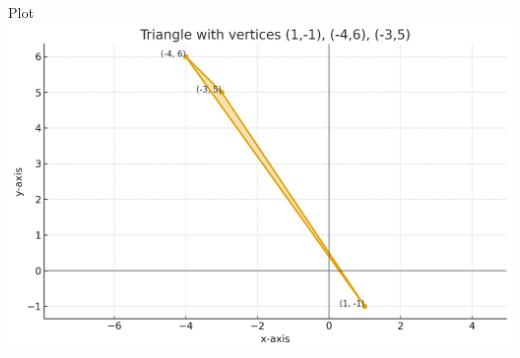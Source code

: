 \documentclass{beamer}
\begin{document}
\begin{frame}{Plot}
    \centering
    \includegraphics[width=\columnwidth, height=0.8\textheight, keepaspectratio]{figs/python_plot.png}     
\end{frame}
\end{document}
